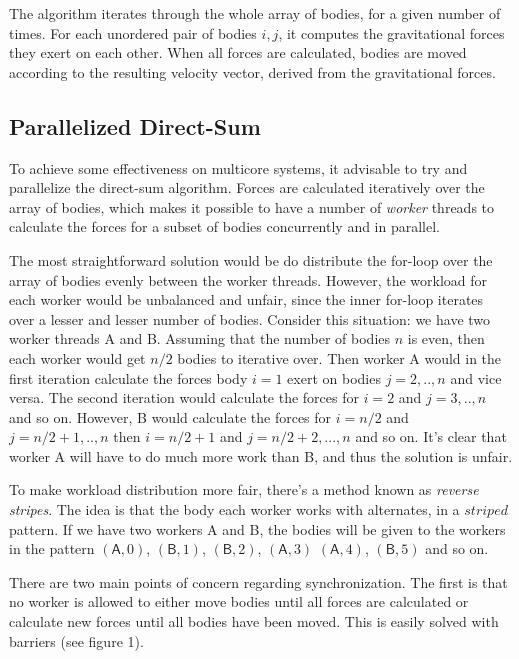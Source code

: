 \documentclass[10pt,a4paper]{article}
\begin{document}
The algorithm iterates through the whole array of bodies, for a given number of times. For each unordered pair of bodies $i, j$, it computes the gravitational forces they exert on each other. When all forces are calculated, bodies are moved according to the resulting velocity vector, derived from the gravitational forces.
\subsection{Parallelized Direct-Sum}
To achieve some effectiveness on multicore systems, it advisable to try and parallelize the direct-sum algorithm. Forces are calculated iteratively over the array of bodies, which makes it possible to have a number of \emph{worker} threads to calculate the forces for a subset of bodies concurrently and in parallel. 

The most straightforward solution would be do distribute the for-loop over the array of bodies evenly between the worker threads. However, the workload for each worker would be unbalanced and unfair, since the inner for-loop iterates over a lesser and lesser number of bodies. Consider this situation: we have two worker threads \textsf{A} and \textsf{B}. Assuming that the number of bodies $n$ is even, then each worker would get $n/2$ bodies to iterative over. Then worker \textsf{A} would in the first iteration calculate the forces body $i = 1$ exert on bodies $j = 2,..,n$ and vice versa. The second iteration would calculate the forces for $i = 2$ and $j = 3,..,n$ and so on. However, \textsf{B} would calculate the forces for $i = n/2$ and $j = n/2 +1,..,n$ then $i = n/2 + 1$ and $j = n/2 + 2,...,n$ and so on. It's clear that worker \textsf{A} will have to do much more work than \textsf{B}, and thus the solution is unfair.

To make workload distribution more fair, there's a method known as \emph{reverse stripes}\cite{mpd}. The idea is that the body each worker works with alternates, in a $striped$ pattern. If we have two workers \textsf{A} and \textsf{B}, the bodies will be given to the workers in the pattern $(\textsf{A}, 0)$, $(\textsf{B}, 1)$, $(\textsf{B}, 2)$, $(\textsf{A}, 3)$ $(\textsf{A}, 4)$, $(\textsf{B}, 5)$ and so on. 

There are two main points of concern regarding synchronization. The first is that no worker is allowed to either move bodies until all forces are calculated or calculate new forces until all bodies have been moved. This is easily solved with barriers (see figure 1).
\end{document}
